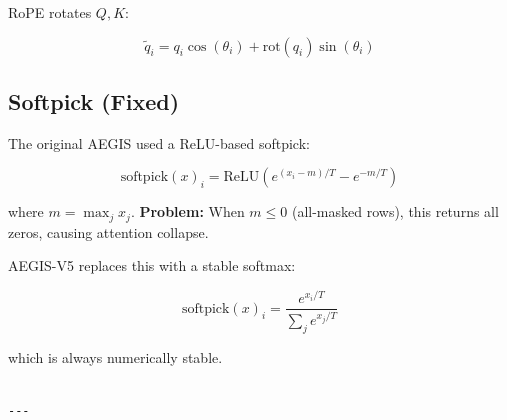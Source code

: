 RoPE rotates $Q, K$:

\begin{equation}
\tilde{q}_i = q_i \cos(\theta_i) + \text{rot}(q_i) \sin(\theta_i)
\end{equation}

\subsection{Softpick (Fixed)}

The original AEGIS used a ReLU-based softpick:

\begin{equation}
\text{softpick}(x)_i = \text{ReLU}\!\left(e^{(x_i - m)/T} - e^{-m/T}\right)
\end{equation}

where $m = \max_j x_j$. \textbf{Problem:} When $m \leq 0$ (all-masked rows), 
this returns all zeros, causing attention collapse.

AEGIS-V5 replaces this with a stable softmax:

\begin{equation}
\text{softpick}(x)_i = \frac{e^{x_i / T}}{\sum_j e^{x_j / T}}
\end{equation}

which is always numerically stable.
\begin{lstlisting}

---
\end{lstlisting}